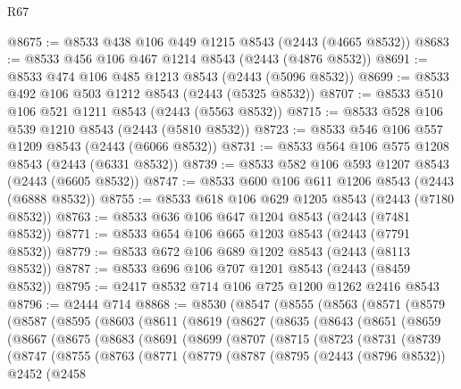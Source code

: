 \begin{lexlean}{R67}
\begin{coremodule}
@8675 := @8533 @438 @106 @449 @1215 @8543 (@2443 (@4665 @8532))
@8683 := @8533 @456 @106 @467 @1214 @8543 (@2443 (@4876 @8532))
@8691 := @8533 @474 @106 @485 @1213 @8543 (@2443 (@5096 @8532))
@8699 := @8533 @492 @106 @503 @1212 @8543 (@2443 (@5325 @8532))
@8707 := @8533 @510 @106 @521 @1211 @8543 (@2443 (@5563 @8532))
@8715 := @8533 @528 @106 @539 @1210 @8543 (@2443 (@5810 @8532))
@8723 := @8533 @546 @106 @557 @1209 @8543 (@2443 (@6066 @8532))
@8731 := @8533 @564 @106 @575 @1208 @8543 (@2443 (@6331 @8532))
@8739 := @8533 @582 @106 @593 @1207 @8543 (@2443 (@6605 @8532))
@8747 := @8533 @600 @106 @611 @1206 @8543 (@2443 (@6888 @8532))
@8755 := @8533 @618 @106 @629 @1205 @8543 (@2443 (@7180 @8532))
@8763 := @8533 @636 @106 @647 @1204 @8543 (@2443 (@7481 @8532))
@8771 := @8533 @654 @106 @665 @1203 @8543 (@2443 (@7791 @8532))
@8779 := @8533 @672 @106 @689 @1202 @8543 (@2443 (@8113 @8532))
@8787 := @8533 @696 @106 @707 @1201 @8543 (@2443 (@8459 @8532))
@8795 := @2417 @8532 @714 @106 @725 @1200 @1262 @2416 @8543
@8796 := @2444 @714
@8868 := @8530
    (@8547
      (@8555
        (@8563
          (@8571
            (@8579
              (@8587
                (@8595
                  (@8603
                    (@8611
                      (@8619
                        (@8627
                          (@8635
                            (@8643
                              (@8651
                                (@8659
                                  (@8667
                                    (@8675
                                      (@8683
                                        (@8691
                                          (@8699
                                            (@8707
                                              (@8715
                                                (@8723
                                                  (@8731
                                                    (@8739
                                                      (@8747
                                                        (@8755
                                                          (@8763
                                                            (@8771
                                                              (@8779
                                                                (@8787
                                                                  (@8795
                                                                    (@2443 (@8796 @8532))
                                                                    @2452
                                                                    (@2458

\end{coremodule}
\end{lexlean}
